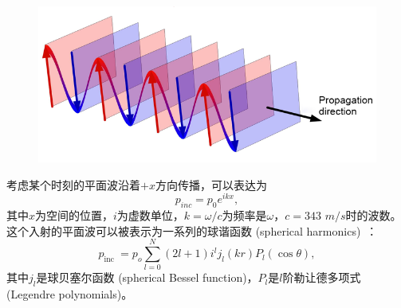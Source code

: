 \begin{figure}[!htbp]
  \centering
    \includegraphics[width=0.7\columnwidth]{figures/plane_wave.png}
  \label{img:plane_wave}
\end{figure}

考虑某个时刻的平面波沿着$+x$方向传播，可以表达为
\begin{equation}
  p_{inc}=p_0 e^{ikx},
\end{equation}
其中$x$为空间的位置，$i$为虚数单位，$k=\omega/c$为频率是$\omega$，$c=343$ $m/s$时的波数。这个入射的平面波可以被表示为一系列的球谐函数 (spherical harmonics)~\cite{rayleigh1896theory}：
\begin{equation}
  p_{\text {inc }}=p_{o} \sum_{l=0}^{N}(2 l+1) i^{l} j_{l}(k r) P_{l}(\cos \theta),
\end{equation}
其中$j_{l}$是球贝塞尔函数 (spherical Bessel function)，$P_{l}$是$l$阶勒让德多项式 (Legendre polynomials)。

